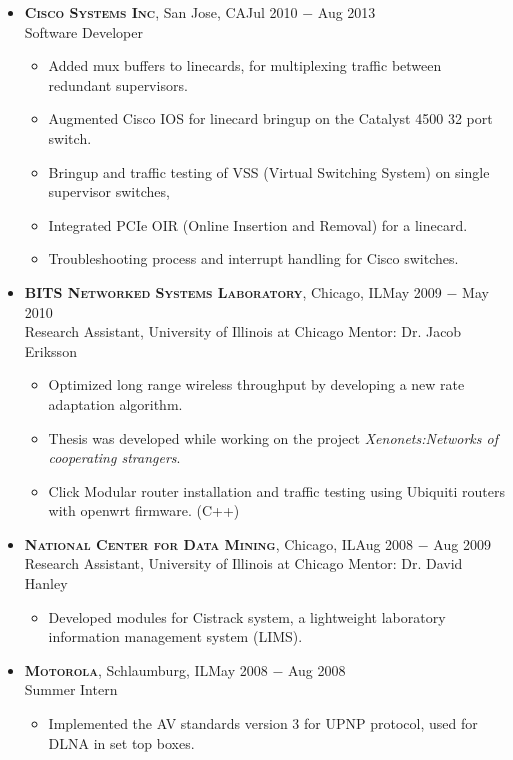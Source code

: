\documentclass[10pt,oneside]{article}
\newcommand{\subheader}[1]{\textsc{\textbf{\large{#1}}}}
\begin{document}
\begin{itemize}
    \item
      \subheader{Cisco Systems Inc}, San Jose, CA\hfill Jul 2010 $-$ Aug 2013\\
      Software Developer
      \vspace{-4 pt}
      \begin{itemize}
        \item Added mux buffers to linecards, for multiplexing traffic between redundant supervisors.
        \item Augmented Cisco IOS for linecard bringup on the Catalyst 4500\textsuperscript{\textregistered} 32 port switch.
        \item Bringup and traffic testing of VSS (Virtual Switching System) on single supervisor switches,
        \item Integrated PCIe OIR (Online Insertion and Removal) for a linecard.
        \item Troubleshooting process and interrupt handling for Cisco switches.
      \end{itemize} 

    \item
      \subheader{BITS Networked Systems Laboratory}, Chicago, IL\hfill May 2009 $-$ May 2010\\
      Research Assistant, University of Illinois at Chicago 
      Mentor: Dr. Jacob Eriksson
      \vspace{-4 pt}
	    \begin{itemize}
        \item Optimized long range wireless throughput by developing a new rate adaptation algorithm.
        \item Thesis was developed while working on the project \emph{Xenonets:Networks of cooperating strangers}.
        \item Click Modular router installation and traffic testing using Ubiquiti routers with openwrt firmware. (C++)
      \end{itemize}  

    \item
      \subheader{National Center for Data Mining}, Chicago, IL\hfill Aug 2008 $-$ Aug 2009
      Research Assistant, University of Illinois at Chicago 
      Mentor: Dr. David Hanley
      \vspace{-4 pt}
      \begin{itemize}
        \item Developed modules for Cistrack system, a lightweight laboratory information management system (LIMS).
      \end{itemize}

    \item
      \subheader{Motorola}, Schlaumburg, IL\hfill May 2008 $-$ Aug 2008\\
      Summer Intern
      \vspace{-4 pt}
      \begin{itemize}
  	    \item Implemented the AV standards version 3 for UPNP protocol, used for DLNA in set top boxes.
      \end{itemize}
  \end{itemize}
\end{document}
